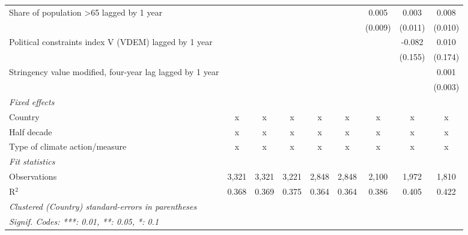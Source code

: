 \begin{tabular}{lcccccccc}
   Share of population >65 lagged by 1 year                  &               &               &                &                &                & 0.005          & 0.003          & 0.008\\   
                                                             &               &               &                &                &                & (0.009)        & (0.011)        & (0.010)\\   
   Political constraints index V (VDEM) lagged by 1 year     &               &               &                &                &                &                & -0.082         & 0.010\\   
                                                             &               &               &                &                &                &                & (0.155)        & (0.174)\\   
   Stringency value modified, four-year lag lagged by 1 year &               &               &                &                &                &                &                & 0.001\\   
                                                             &               &               &                &                &                &                &                & (0.003)\\   
   \emph{Fixed effects}\\
   Country                                                   & x             & x             & x              & x              & x              & x              & x              & x\\  
   Half decade                                               & x             & x             & x              & x              & x              & x              & x              & x\\  
   Type of climate action/measure                            & x             & x             & x              & x              & x              & x              & x              & x\\  
   \midrule \emph{Fit statistics}\\
   Observations                                              & 3,321         & 3,321         & 3,221          & 2,848          & 2,848          & 2,100          & 1,972          & 1,810\\  
   R$^2$                                                     & 0.368         & 0.369         & 0.375          & 0.364          & 0.364          & 0.386          & 0.405          & 0.422\\  
   \midrule
   \multicolumn{9}{l}{\emph{Clustered (Country) standard-errors in parentheses}}\\
   \multicolumn{9}{l}{\emph{Signif. Codes: ***: 0.01, **: 0.05, *: 0.1}}\\
\end{tabular}
\par\endgroup


